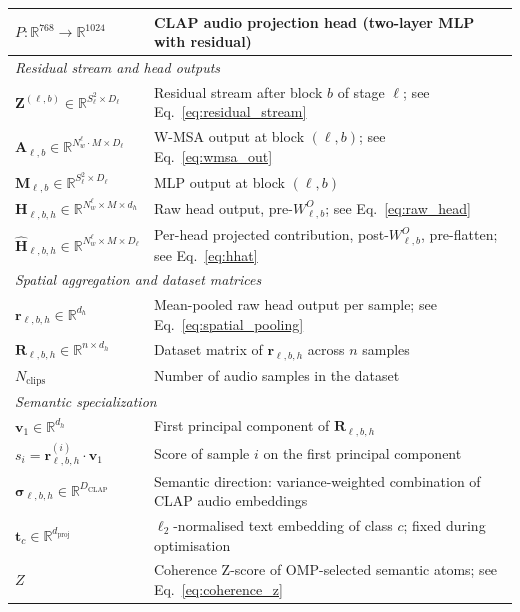 \begin{table}[h]
\begin{tabularx}{\textwidth}{lX}
$P: \mathbb{R}^{768} \to \mathbb{R}^{1024}$ & CLAP audio projection head (two-layer MLP with residual) \\
\midrule
\multicolumn{2}{l}{\textit{Residual stream and head outputs}} \\
\midrule
$\mathbf{Z}^{(\ell,b)} \in \mathbb{R}^{S_\ell^2 \times D_\ell}$ & Residual stream after block $b$ of stage $\ell$; see Eq.~\eqref{eq:residual_stream} \\
$\mathbf{A}_{\ell,b} \in \mathbb{R}^{N_w^\ell \cdot M \times D_\ell}$ & W-MSA output at block $(\ell,b)$; see Eq.~\eqref{eq:wmsa_out} \\
$\mathbf{M}_{\ell,b} \in \mathbb{R}^{S_\ell^2 \times D_\ell}$ & MLP output at block $(\ell,b)$ \\
$\mathbf{H}_{\ell,b,h} \in \mathbb{R}^{N_w^\ell \times M \times d_h}$ & Raw head output, pre-$W^O_{\ell,b}$; see Eq.~\eqref{eq:raw_head} \\
$\widehat{\mathbf{H}}_{\ell,b,h} \in \mathbb{R}^{N_w^\ell \times M \times D_\ell}$ & Per-head projected contribution, post-$W^O_{\ell,b}$, pre-flatten; see Eq.~\eqref{eq:hhat} \\
\midrule
\multicolumn{2}{l}{\textit{Spatial aggregation and dataset matrices}} \\
\midrule
$\mathbf{r}_{\ell,b,h} \in \mathbb{R}^{d_h}$ & Mean-pooled raw head output per sample; see Eq.~\eqref{eq:spatial_pooling} \\
$\mathbf{R}_{\ell,b,h} \in \mathbb{R}^{n \times d_h}$ & Dataset matrix of $\mathbf{r}_{\ell,b,h}$ across $n$ samples \\
$N_{\text{clips}}$ & Number of audio samples in the dataset \\
\midrule
\multicolumn{2}{l}{\textit{Semantic specialization}} \\
\midrule
$\mathbf{v}_1 \in \mathbb{R}^{d_h}$ & First principal component of $\mathbf{R}_{\ell,b,h}$ \\
$s_i = \mathbf{r}_{\ell,b,h}^{(i)}\cdot\mathbf{v}_1$ & Score of sample $i$ on the first principal component \\
$\boldsymbol{\sigma}_{\ell,b,h} \in \mathbb{R}^{D_{\mathrm{CLAP}}}$ & Semantic direction: variance-weighted combination of CLAP audio embeddings \\
$\mathbf{t}_c \in \mathbb{R}^{d_{\mathrm{proj}}}$ & $\ell_2$-normalised text embedding of class $c$; fixed during optimisation \\
$Z$ & Coherence Z-score of OMP-selected semantic atoms; see Eq.~\eqref{eq:coherence_z} \\

\end{tabularx}
\end{table}
